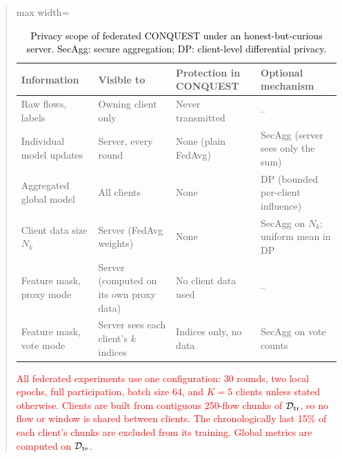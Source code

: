 \documentclass[11pt]{article}
\newenvironment{excerpt}{\begin{quote}\sloppy}{\end{quote}}
\begin{document}
\begin{excerpt}
\setcounter{table}{7}
\begin{table}[H]
\centering
\scriptsize
\caption{\textcolor{black}{Privacy scope of federated CONQUEST
under an honest-but-curious server. SecAgg: secure aggregation; DP:
client-level differential privacy.}}

\color{black}
\setlength{\tabcolsep}{3pt}
\renewcommand{\arraystretch}{1.08}
\begin{adjustbox}{max width=\linewidth}
\begin{tabular}{p{1.7cm} p{1.6cm} p{1.75cm} p{1.75cm}}
\hline\toprule
\textbf{Information} & \textbf{Visible to} & \textbf{Protection in CONQUEST} & \textbf{Optional mechanism} \\
\hline\toprule
Raw flows, labels & Owning client only & Never transmitted & -- \\
Individual model updates & Server, every round & None (plain FedAvg) & SecAgg (server sees only the sum) \\
Aggregated global model & All clients & None & DP (bounded per-client influence) \\
Client data size $N_k$ & Server (FedAvg weights) & None & SecAgg on $N_k$; uniform mean in DP \\
Feature mask, proxy mode & Server (computed on its own proxy data) & No client data used & -- \\
Feature mask, vote mode & Server sees each client's $k$ indices & Indices only, no data & SecAgg on vote counts \\
\hline\toprule
\end{tabular}
\end{adjustbox}
\end{table}

\textcolor{red}{All federated experiments use one
configuration: 30 rounds, two local epochs, full participation, batch
size 64, and $K=5$ clients unless stated otherwise. Clients are built
from contiguous 250-flow chunks of $\mathcal{D}_{\rm tr}$, so no flow
or window is shared between clients. The chronologically last 15\% of
each client's chunks are excluded from its training. Global metrics
are computed on $\mathcal{D}_{\rm te}$.}
\end{excerpt}
\end{document}
